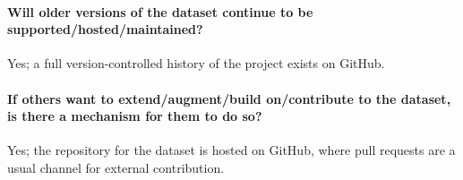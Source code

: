 \paragraph{Will older versions of the dataset continue to be supported/hosted/maintained?}
Yes; a full version-controlled history of the project exists on GitHub.

\paragraph{If others want to extend/augment/build on/contribute to the dataset, is there a mechanism for them to do so?}
Yes; the repository for the dataset is hosted on GitHub, where pull requests are a usual channel for external contribution.
